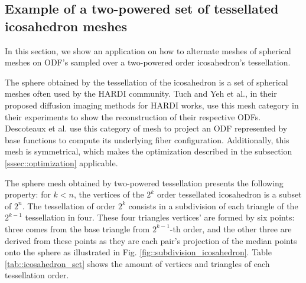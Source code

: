 \documentclass[twoside,twocolumn,10pt]{article}
\begin{document}

\subsection{Example of a two-powered set of tessellated icosahedron meshes}

In this section, we show an application on how to alternate meshes of spherical meshes on ODF's sampled over a two-powered order icosahedron's tessellation.

The sphere obtained by the tessellation of the icosahedron is a set of spherical meshes often used by the HARDI community. Tuch \cite{TuchQBall2004} and Yeh et al., \cite{yeh2010} in their proposed diffusion imaging methods for HARDI works, use this mesh category in their experiments to show the reconstruction of their respective ODFs. Descoteaux et al. \cite{descoteaux2007} use this category of mesh to project an ODF represented by base functions to compute its underlying fiber configuration. Additionally, this mesh is symmetrical, which makes the optimization described in the subsection \ref{sssec::optimization} applicable.

The sphere mesh obtained by two-powered tessellation presents the following property:  for $k < n$, the vertices of the $2^{k}$ order tessellated icosahedron is a subset of $2^{n}$. The tessellation of order $2^k$ consists in a subdivision of each triangle of the $2^{k-1}$ tessellation in four. These four triangles vertices' are formed by six points: three comes from the base triangle from $2^{k-1}$-th order, and the other three are derived from these points as they are each pair's projection of the median points onto the sphere as illustrated in Fig. \ref{fig::subdivision_icosahedron}. Table \ref{tab::icosahedron_set} shows the amount of vertices and triangles of each tessellation order.
\end{document}
